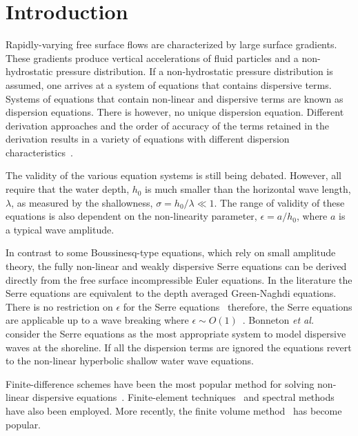 \documentclass[preprint,sort&compress,1p]{article}
\begin{document}

\section{Introduction} \label{intro}

Rapidly-varying free surface flows are characterized by large surface gradients. These gradients produce vertical accelerations of fluid particles and a non-hydrostatic pressure distribution. If a non-hydrostatic pressure distribution is assumed, one arrives at a system of equations that contains dispersive terms. Systems of equations that contain non-linear and dispersive terms are known as dispersion equations. There is however, no unique dispersion equation. Different derivation approaches and the order of accuracy of the terms retained in the derivation results in a variety of equations with different dispersion characteristics~\cite{Madsen-etal-1991-371}.

The validity of the various equation systems is still being debated. However, all require that the water depth, $h_0$ is much smaller than the horizontal wave length, $\lambda$, as measured by the  shallowness, $\sigma = h_0/\lambda \ll 1$.
The range of validity of these equations is also dependent on the non-linearity parameter, $\epsilon = a/h_0$, where $a$ is a typical wave amplitude.

In contrast to some Boussinesq-type equations, which rely on small amplitude theory, the fully non-linear and weakly dispersive Serre equations can be derived directly from the free surface incompressible Euler equations. In the literature the Serre equations are equivalent to the depth averaged Green-Naghdi equations. There is no restriction on $\epsilon$ for the Serre equations~\cite{Li-Y-2006-1255} therefore, the Serre equations are applicable up to a wave breaking where $\epsilon \sim O(1)$~\cite{Barthelemy-E-2004-315}. Bonneton \emph{et al.}~\cite{Bonneton-etal-2011-1479, Bonneton-etal-2011-589} consider the Serre equations as the most appropriate system to model dispersive waves at the shoreline. If all the dispersion terms are ignored the equations revert to the non-linear hyperbolic shallow water wave equations.

Finite-difference schemes have been the most popular method for solving non-linear dispersive equations~\cite{Antunes-do-Carmo-etal-1993-725,Nwogu-O-1993-618,El-etal-2008-2423,Beji-Nadaoka-1996}. Finite-element techniques~\cite{Avilez-Valente-Seabra-Santos-2009-969,Mitsotakis-D-2009-860,Li-etal-2014-169} and spectral methods~\cite{Dias-Milewski-2010,Eskilsson-Sherwin-2002-143} have also been employed. More recently, the finite volume method~\cite{Shiach-Mingham-2009-32,Erduran-etal-2005-1213,Erduran-K-2007-827,Soares-Frazao-Guinot-2008-237,Tonelli-Petti-2012-8,Roeber-etal-2010-407,Tonelli-Petti-2009-609} has become popular.
\end{document}
